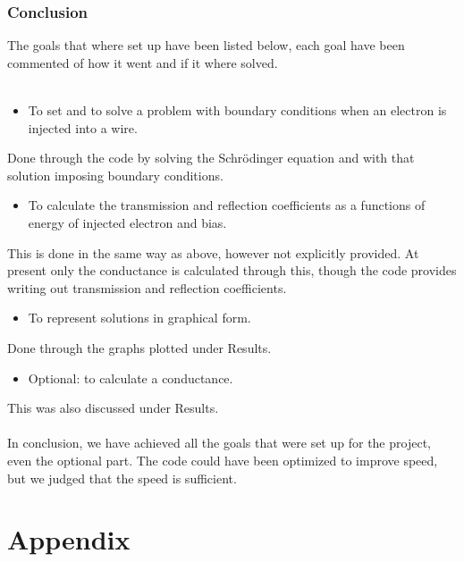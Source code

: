 \documentclass[a4paper]{article}
\begin{document}
\section{Conclusion}
The goals that where set up have been listed below, each goal have been commented of how it went and if it where solved.
\\\\
\begin{itemize}
\item To set and to solve a problem with boundary conditions when an electron is injected into a wire.
\end{itemize}
Done through the code by solving the Schr\"odinger equation and with that solution imposing boundary conditions.
\begin{itemize}
\item To calculate the transmission and reflection coefficients as a functions of energy of injected electron and bias.
\end{itemize}
This is done in the same way as above, however not explicitly provided. At present only the conductance is calculated through this, though the code provides writing out transmission and reflection coefficients.
\begin{itemize}
\item To represent solutions in graphical form.
\end{itemize}
Done through the graphs plotted under Results.
\begin{itemize}
\item Optional: to calculate a conductance.
\end{itemize}
This was also discussed under Results.
\\\\
In conclusion, we have achieved all the goals that were set up for the project, even the optional part.  The code could have been optimized to improve speed, but we judged that the speed is sufficient.

\newpage



\newpage
\part*{Appendix}


\end{document}
